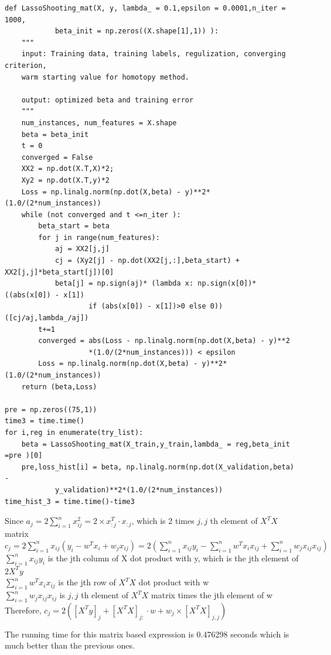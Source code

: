 \documentclass{article}
\begin{document}
\begin{verbatim}
def LassoShooting_mat(X, y, lambda_ = 0.1,epsilon = 0.0001,n_iter = 1000,
			beta_init = np.zeros((X.shape[1],1)) ):
	"""
	input: Training data, training labels, regulization, converging criterion, 
	warm starting value for homotopy method.
		
	output: optimized beta and training error
	"""
	num_instances, num_features = X.shape      
	beta = beta_init
	t = 0
	converged = False
	XX2 = np.dot(X.T,X)*2;
	Xy2 = np.dot(X.T,y)*2
	Loss = np.linalg.norm(np.dot(X,beta) - y)**2*(1.0/(2*num_instances))
	while (not converged and t <=n_iter ):
		beta_start = beta
		for j in range(num_features):
			aj = XX2[j,j]
			cj = (Xy2[j] - np.dot(XX2[j,:],beta_start) + XX2[j,j]*beta_start[j])[0]
			beta[j] = np.sign(aj)* (lambda x: np.sign(x[0])* ((abs(x[0]) - x[1]) 
					if (abs(x[0]) - x[1])>0 else 0))([cj/aj,lambda_/aj])
		t+=1
		converged = abs(Loss - np.linalg.norm(np.dot(X,beta) - y)**2
					*(1.0/(2*num_instances))) < epsilon
		Loss = np.linalg.norm(np.dot(X,beta) - y)**2*(1.0/(2*num_instances))
	return (beta,Loss)

pre = np.zeros((75,1))
time3 = time.time()
for i,reg in enumerate(try_list):
	beta = LassoShooting_mat(X_train,y_train,lambda_ = reg,beta_init =pre )[0]
	pre,loss_hist[i] = beta, np.linalg.norm(np.dot(X_validation,beta) -
			y_validation)**2*(1.0/(2*num_instances))
time_hist_3 = time.time()-time3
\end{verbatim}

Since $a_j = 2\sum_{i=1}^{n} x^2_{ij}  =2\times x_{: j}^T \cdot x_{: j}$, which is 2 times $j,j $ th element of $X^TX$ matrix\\

$c_j  = 2\sum_{i=1}^{n} x_{ij}(y_i - w^Tx_i + w_jx_{ij}) = 2( \sum_{i=1}^{n} x_{ij} y_i - \sum_{i=1}^{n} w^Tx_i x_{ij} + \sum_{i=1}^{n}  w_jx_{ij} x_{ij} )$\\
$\sum_{i=1}^{n}  x_{ij} y_i$ is the jth column of X dot product with y, which is the jth element of $2X^Ty$\\
$ \sum_{i=1}^{n}  w^Tx_i x_{ij} $ is the jth row of $X^TX$ dot product with w\\
$\sum_{i=1}^{n}  w_jx_{ij} x_{ij} $ is $j,j $ th element of $X^TX$ matrix times the jth element of w\\
Therefore, $c_j = 2([X^Ty]_{j} + [X^TX]_{j:} \cdot w + w_j \times [X^TX]_{j,j})$ 

The running time for this matrix based expression is 0.476298 seconds which is much better than the previous ones.
\end{document}
